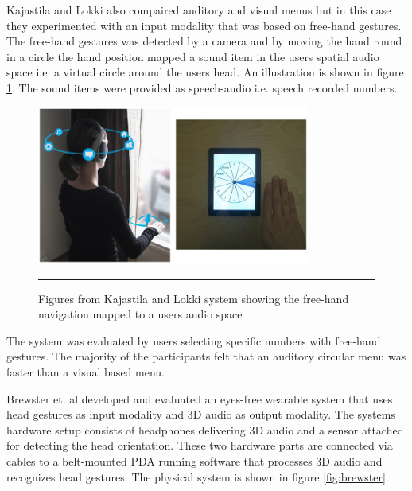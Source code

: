 Kajastila and Lokki \cite{kajastila_interaction_2013} also compaired auditory and visual menus but in this case they experimented with an input modality that was based on free-hand gestures. The free-hand gestures was detected by a camera and by moving the hand round in a circle the hand position mapped a sound item in the users spatial audio space i.e. a virtual circle around the users head. An illustration is shown in figure \ref{fig:kajastila}. The sound items were provided as speech-audio i.e. speech recorded numbers.

\begin{figure}[htbp]
	\centering
		\includegraphics[width=0.8\textwidth,height=\textheight,keepaspectratio]{./Figures/kajastila-system.png}
		\rule{35em}{0.5pt}
	\caption[Pirhonen system]{Figures from Kajastila and Lokki \cite{kajastila_interaction_2013} system showing the free-hand navigation mapped to a users audio space}
	\label{fig:kajastila}
\end{figure}

The system was evaluated by users selecting specific numbers with free-hand gestures. The majority of the participants felt that an auditory circular menu was faster than a visual based menu.


Brewster et. al \cite{brewster_multimodaleyes-freeinteraction_2003} developed and evaluated an eyes-free wearable system that uses head gestures as input modality and 3D audio as output modality. The systems hardware setup consists of headphones delivering 3D audio and a sensor attached for detecting the head orientation. These two hardware parts are connected via cables to a belt-mounted PDA running software that processes 3D audio and recognizes head gestures. The physical system is shown in figure \ref{fig:brewster}.

